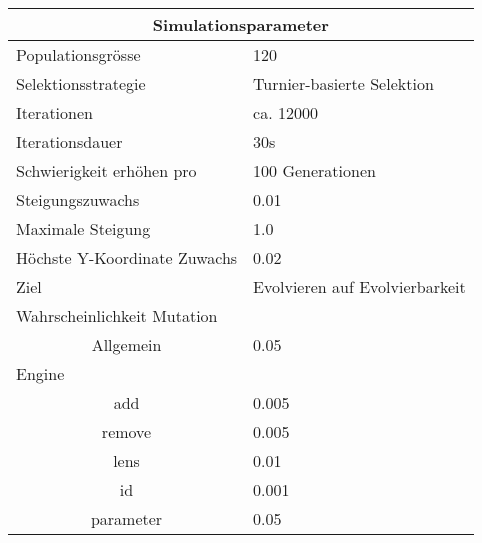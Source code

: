 
\begin{tabular}{ | l | l | }

  \hline
  \multicolumn{2}{|c|}{Simulationsparameter} \\
  \hline
  Populationsgrösse & 120 \\ \hline
  Selektionsstrategie & Turnier-basierte Selektion \\ \hline
  Iterationen & ca. 12000 \\ \hline
  Iterationsdauer & 30s \\ \hline
  Schwierigkeit erhöhen pro & 100 Generationen \\ \hline
  Steigungszuwachs & 0.01 \\ \hline
  Maximale Steigung & 1.0 \\ \hline
  Höchste Y-Koordinate Zuwachs  & 0.02 \\ \hline
  Ziel & Evolvieren auf Evolvierbarkeit \\ \hline
  \multicolumn{2}{|l|}{Wahrscheinlichkeit Mutation}\\ \hline
  \multicolumn{1}{|c|}{Allgemein} & 0.05 \\ \hline
  Engine &  \\ \hline
  \multicolumn{1}{|c|}{add} & 0.005 \\ \hline
  \multicolumn{1}{|c|}{remove} & 0.005 \\ \hline
  \multicolumn{1}{|c|}{lens} & 0.01 \\ \hline
  \multicolumn{1}{|c|}{id} & 0.001 \\ \hline
  \multicolumn{1}{|c|}{parameter} & 0.05 \\ \hline

\end{tabular}
